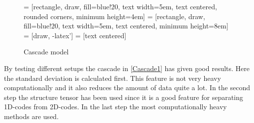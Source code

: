 \begin{figure}[H]
\centering
{} = [rectangle, draw, fill=blue!20, 
    text width=5em, text centered, rounded corners, minimum height=4em]
 = [rectangle, draw, fill=blue!20, 
    text width=5em, text centered, minimum height=8em]
 = [draw, -latex']
 = [text centered]

\caption{Cascade model}
\label{Cascade}
\end{figure}

By testing different setups the cascade in \ref{Cascade1} has given good results. Here the standard deviation is calculated first. This feature is not very heavy computationally and it also reduces the amount of data quite a lot. In the second step the structure tensor has been used since it is a good feature for separating 1D-codes from 2D-codes. In the last step the most computationally heavy methods are used.  

